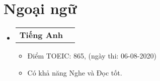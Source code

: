 \documentclass[letterpaper,11pt]{article}
\makeatletter
\newcommand{\resumeItem}[1]{
  	\item\small{
    	{#1 \vspace{-2pt}}
  	}
}
\newcommand{\resumeSubheading}[4]{
  	\vspace{-2pt}\item
    \begin{tabular*}{1.0\textwidth}[t]{l@{\extracolsep{\fill}}r}
		\textbf{#1} & \textbf{\small #2} \\
		\textit{\small#3} & \textit{\small #4} \\
    \end{tabular*}\vspace{-7pt}
}
\newcommand{\resumeProjectHeading}[2]{
    \item
    \begin{tabular*}{1.001\textwidth}{l@{\extracolsep{\fill}}r}
      	\small#1 & \textbf{\small #2}\\
    \end{tabular*}\vspace{-7pt}
}
\newcommand{\resumeSubHeadingListStart}{\begin{itemize}[leftmargin=0.0in, label={}]}
\newcommand{\resumeSubHeadingListEnd}{\end{itemize}}
\newcommand{\resumeItemListStart}{\begin{itemize}}
\newcommand{\resumeItemListEnd}{\end{itemize}\vspace{-5pt}}
\makeatother
\begin{document}
%
%
%    

\section{Ngoại ngữ}
    \vspace{-5pt}
    \resumeSubHeadingListStart
      	\resumeProjectHeading
          	{\textbf{Tiếng Anh}}{}
          	\resumeItemListStart
            	\resumeItem{Điểm TOEIC: 865, (ngày thi: 06-08-2020)}
            	\resumeItem{Có khả năng Nghe và Đọc tốt.}
          	\resumeItemListEnd 
    \resumeSubHeadingListEnd
\vspace{-15pt}
\end{document}

